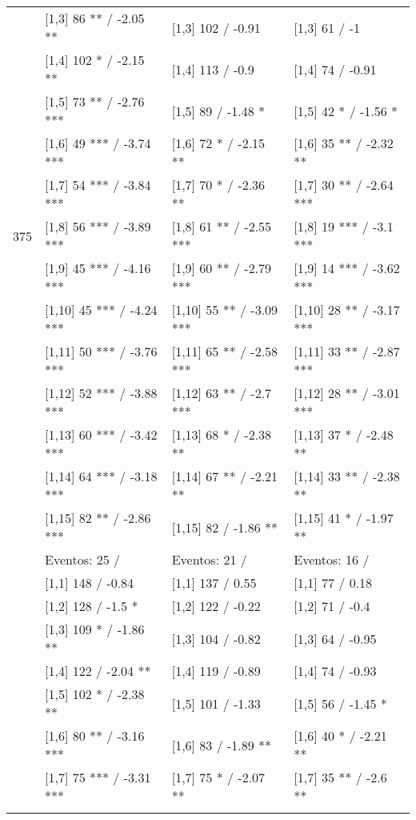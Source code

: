 \begin{table}
\begin{tabular}[t]{llll}
 & {}[1,3] 86 ** / -2.05 ** & {}[1,3] 102  / -0.91 & {}[1,3] 61  / -1\\
\addlinespace
 & {}[1,4] 102 * / -2.15 ** & {}[1,4] 113  / -0.9 & {}[1,4] 74  / -0.91\\
 & {}[1,5] 73 ** / -2.76 *** & {}[1,5] 89  / -1.48 * & {}[1,5] 42 * / -1.56 *\\
 & {}[1,6] 49 *** / -3.74 *** & {}[1,6] 72 * / -2.15 ** & {}[1,6] 35 ** / -2.32 **\\
 & {}[1,7] 54 *** / -3.84 *** & {}[1,7] 70 * / -2.36 ** & {}[1,7] 30 ** / -2.64 ***\\
375 & {}[1,8] 56 *** / -3.89 *** & {}[1,8] 61 ** / -2.55 *** & {}[1,8] 19 *** / -3.1 ***\\
\addlinespace
 & {}[1,9] 45 *** / -4.16 *** & {}[1,9] 60 ** / -2.79 *** & {}[1,9] 14 *** / -3.62 ***\\
 & {}[1,10] 45 *** / -4.24 *** & {}[1,10] 55 ** / -3.09 *** & {}[1,10] 28 ** / -3.17 ***\\
 & {}[1,11] 50 *** / -3.76 *** & {}[1,11] 65 ** / -2.58 *** & {}[1,11] 33 ** / -2.87 ***\\
 & {}[1,12] 52 *** / -3.88 *** & {}[1,12] 63 ** / -2.7 *** & {}[1,12] 28 ** / -3.01 ***\\
 & {}[1,13] 60 *** / -3.42 *** & {}[1,13] 68 * / -2.38 ** & {}[1,13] 37 * / -2.48 **\\
\addlinespace
 & {}[1,14] 64 *** / -3.18 *** & {}[1,14] 67 ** / -2.21 ** & {}[1,14] 33 ** / -2.38 **\\
 & {}[1,15] 82 ** / -2.86 *** & {}[1,15] 82  / -1.86 ** & {}[1,15] 41 * / -1.97 **\\
 & Eventos:  25 / & Eventos:  21 / & Eventos:  16 /\\
 & {}[1,1] 148  / -0.84 & {}[1,1] 137  / 0.55 & {}[1,1] 77  / 0.18\\
 & {}[1,2] 128  / -1.5 * & {}[1,2] 122  / -0.22 & {}[1,2] 71  / -0.4\\
\addlinespace
 & {}[1,3] 109 * / -1.86 ** & {}[1,3] 104  / -0.82 & {}[1,3] 64  / -0.95\\
 & {}[1,4] 122  / -2.04 ** & {}[1,4] 119  / -0.89 & {}[1,4] 74  / -0.93\\
 & {}[1,5] 102 * / -2.38 ** & {}[1,5] 101  / -1.33 & {}[1,5] 56  / -1.45 *\\
 & {}[1,6] 80 ** / -3.16 *** & {}[1,6] 83  / -1.89 ** & {}[1,6] 40 * / -2.21 **\\
 & {}[1,7] 75 *** / -3.31 *** & {}[1,7] 75 * / -2.07 ** & {}[1,7] 35 ** / -2.6 **\\
\addlinespace

\end{tabular}
\end{table}
